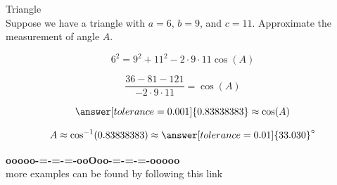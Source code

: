 \documentclass{ximera}
\begin{document}
\begin{example} Triangle \\

Suppose we have a triangle with $a=6$, $b=9$, and $c=11$. Approximate the measurement of angle $A$.

\[    6^2 = 9^2  +  11^2  - 2 \cdot 9 \cdot 11 \cos(A)   \]


\[    \frac{36 - 81 - 121}{- 2 \cdot 9 \cdot 11} =    \cos(A)   \]

\[  \answer[tolerance=0.001]{0.83838383} \approx \cos(A)  \]


\[ A \approx \cos^{-1}(0.83838383)  \approx \answer[tolerance=0.01]{33.030}^{\circ}   \]


\end{example}











\begin{center}
\textbf{\textcolor{green!50!black}{ooooo-=-=-=-ooOoo-=-=-=-ooooo}} \\

more examples can be found by following this link\\ 

\end{center}
\end{document}
